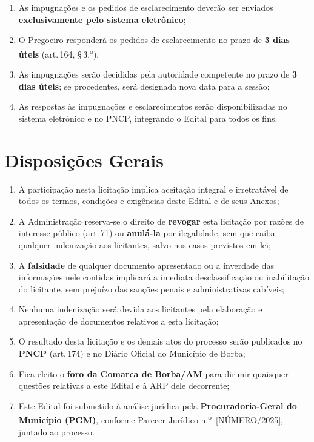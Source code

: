 \documentclass[12pt,a4paper]{article}
\newcommand{\art}[1]{art.\,#1}
\newcommand{\exercicio}{2025}
\begin{document}
\begin{enumerate}
  \item As impugnações e os pedidos de esclarecimento deverão ser enviados
    \textbf{exclusivamente pelo sistema eletrônico};

  \item O Pregoeiro responderá os pedidos de esclarecimento no prazo de
    \textbf{3 dias úteis} (\art{164}, \S\,3.\textsuperscript{o});

  \item As impugnações serão decididas pela autoridade competente no prazo de
    \textbf{3 dias úteis}; se procedentes, será designada nova data para a sessão;

  \item As respostas às impugnações e esclarecimentos serão disponibilizadas no
    sistema eletrônico e no PNCP, integrando o Edital para todos os fins.
\end{enumerate}

\section{Disposições Gerais}

\begin{enumerate}
  \item A participação nesta licitação implica aceitação integral e irretratável
    de todos os termos, condições e exigências deste Edital e de seus Anexos;

  \item A Administração reserva-se o direito de \textbf{revogar} esta licitação
    por razões de interesse público (\art{71}) ou \textbf{anulá-la} por ilegalidade,
    sem que caiba qualquer indenização aos licitantes, salvo nos casos previstos em
    lei;

  \item A \textbf{falsidade} de qualquer documento apresentado ou a inverdade das
    informações nele contidas implicará a imediata desclassificação ou inabilitação
    do licitante, sem prejuízo das sanções penais e administrativas cabíveis;

  \item Nenhuma indenização será devida aos licitantes pela elaboração e apresentação
    de documentos relativos a esta licitação;

  \item O resultado desta licitação e os demais atos do processo serão publicados
    no \textbf{PNCP} (\art{174}) e no Diário Oficial do Município de Borba;

  \item Fica eleito o \textbf{foro da Comarca de Borba/AM} para dirimir quaisquer
    questões relativas a este Edital e à ARP dele decorrente;

  \item Este Edital foi submetido à análise jurídica pela
    \textbf{Procuradoria-Geral do Município (PGM)}, conforme Parecer Jurídico
    n.\textsuperscript{o}\ [NÚMERO/\exercicio], juntado ao processo.
\end{enumerate}
\end{document}
